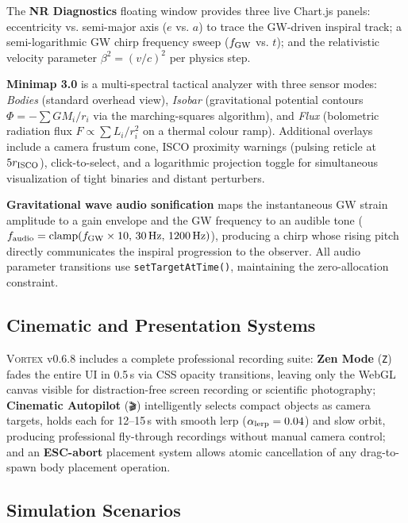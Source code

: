 \documentclass[aps,prd,twocolumn,superscriptaddress,nofootinbib,showpacs,
               longbibliography]{revtex4-2}
\newcommand{\code}[1]{\texttt{#1}}
\begin{document}
The \textbf{NR Diagnostics} floating window provides three live
Chart.js panels: eccentricity vs. semi-major axis ($e$ vs. $a$) to
trace the GW-driven inspiral track; a semi-logarithmic GW chirp
frequency sweep ($f_{\rm GW}$ vs. $t$); and the relativistic velocity
parameter $\beta^2 = (v/c)^2$ per physics step.

\textbf{Minimap 3.0} is a multi-spectral tactical analyzer with three
sensor modes: \emph{Bodies} (standard overhead view), \emph{Isobar}
(gravitational potential contours $\Phi = -\sum GM_i/r_i$ via the
marching-squares algorithm), and \emph{Flux} (bolometric radiation flux
$F \propto \sum L_i/r_i^2$ on a thermal colour ramp).
Additional overlays include a camera frustum cone, ISCO proximity
warnings (pulsing reticle at $5r_{\rm ISCO}$), click-to-select,
and a logarithmic projection toggle for simultaneous visualization of
tight binaries and distant perturbers.

\textbf{Gravitational wave audio sonification}
maps the instantaneous GW strain amplitude to a gain envelope and the
GW frequency to an audible tone ($f_{\rm audio} = \text{clamp}(f_{\rm GW}\times 10,\,30\text{\,Hz},\,1200\text{\,Hz})$),
producing a chirp whose rising pitch directly communicates the inspiral
progression to the observer.
All audio parameter transitions use \code{setTargetAtTime()}, maintaining
the zero-allocation constraint.

\subsection{Cinematic and Presentation Systems}
\label{sec:vortex_cinematic}

\textsc{Vortex} v0.6.8 includes a complete professional recording suite:
\textbf{Zen Mode} (\code{Z}) fades the entire UI in 0.5\,s via CSS
opacity transitions, leaving only the WebGL canvas visible for
distraction-free screen recording or scientific photography;
\textbf{Cinematic Autopilot} (\code{🎬}) intelligently selects compact
objects as camera targets, holds each for 12--15\,s with smooth lerp
($\alpha_{\rm lerp} = 0.04$) and slow orbit, producing professional
fly-through recordings without manual camera control;
and an \textbf{ESC-abort} placement system allows atomic cancellation of
any drag-to-spawn body placement operation.

\subsection{Simulation Scenarios}
\label{sec:vortex_scenarios}
\end{document}
